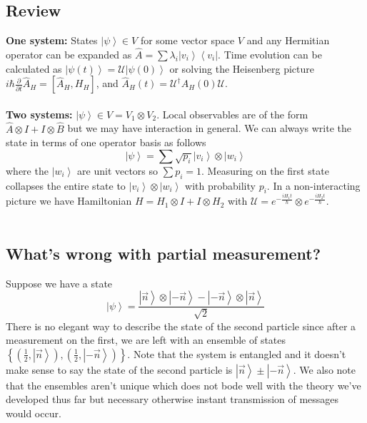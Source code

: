 \documentclass{article}
\newcommand{\bra}[1]{\left\langle #1 \right|}
\newcommand{\ket}[1]{\left|#1\right\rangle}
\begin{document}
\subsection{Review}
\textbf{One system:} States $\ket{\psi} \in V$ for some vector space $V$ and any Hermitian operator can be expanded as $\hat A = \sum \lambda_i \ket{v_i}\bra{v_i}$. Time evolution can be calculated as $\ket{\psi(t)} = \mathcal{U}\ket{\psi(0)}$ or solving the Heisenberg picture $i\hbar \frac{\partial}{\partial t} \hat A_H = [\hat A_H, H_H]$, and $\hat A_H (t) = \mathcal{U}^{\dagger} A_H (0) \mathcal{U}$.\\ \\
\textbf{Two systems:} $\ket{\psi} \in V=V_1 \otimes V_2$. Local observables are of the form $\hat A \otimes I+I \otimes \hat B$ but we may have interaction in general.	We can always write the state in terms of one operator basis as follows 
$$\ket{\psi} = \sum \sqrt{p_i} \ket{v_i} \otimes \ket{w_i}$$
where the $\ket{w_i}$ are unit vectors so $\sum p_i = 1$. Measuring on the first state collapses the entire state to $\ket{v_i}\otimes \ket{w_i}$ with probability $p_i$. In a non-interacting picture we have Hamiltonian $H=H_1 \otimes I + I \otimes H_2$ with $\mathcal{U} = e^{-\frac{iH_1t}{\hbar}} \otimes e^{-\frac{iH_2t}{\hbar}}$.\\ \\
\subsection{What's wrong with partial measurement?}
Suppose we have a state
$$\ket{\psi} =\frac{\ket{\vec n}\otimes \ket{-\vec n} -\ket{-\vec n} \otimes \ket{\vec n}}{\sqrt{2}}$$
There is no elegant way to describe the state of the second particle since after a measurement on the first, we are left with an ensemble of states $\left\{ \left(\frac{1}{2}, \ket{\vec n} \right), \left(\frac{1}{2}, \ket{-\vec n} \right) \right\}$. Note that the system is entangled and it doesn't make sense to say the state of the second particle is $\ket{\vec{n}} \pm \ket{-\vec{n}}$. We also note that the ensembles aren't unique which does not bode well with the theory we've developed thus far but necessary otherwise instant transmission of messages would occur.
\end{document}
